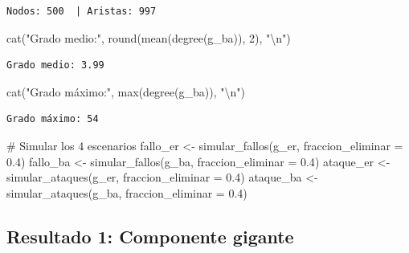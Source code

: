 \documentclass[
  letterpaper,
  DIV=11,
  numbers=noendperiod]{scrreprt}
\newenvironment{Shaded}{\begin{snugshade}}{\end{snugshade}}
\newcommand{\AttributeTok}[1]{\textcolor[rgb]{0.40,0.45,0.13}{#1}}
\newcommand{\CommentTok}[1]{\textcolor[rgb]{0.37,0.37,0.37}{#1}}
\newcommand{\DecValTok}[1]{\textcolor[rgb]{0.68,0.00,0.00}{#1}}
\newcommand{\FloatTok}[1]{\textcolor[rgb]{0.68,0.00,0.00}{#1}}
\newcommand{\FunctionTok}[1]{\textcolor[rgb]{0.28,0.35,0.67}{#1}}
\newcommand{\NormalTok}[1]{\textcolor[rgb]{0.00,0.23,0.31}{#1}}
\newcommand{\OtherTok}[1]{\textcolor[rgb]{0.00,0.23,0.31}{#1}}
\newcommand{\SpecialCharTok}[1]{\textcolor[rgb]{0.37,0.37,0.37}{#1}}
\newcommand{\StringTok}[1]{\textcolor[rgb]{0.13,0.47,0.30}{#1}}
\begin{document}
\begin{verbatim}
Nodos: 500  | Aristas: 997 
\end{verbatim}

\begin{Shaded}
\begin{Highlighting}[]
\FunctionTok{cat}\NormalTok{(}\StringTok{"Grado medio:"}\NormalTok{, }\FunctionTok{round}\NormalTok{(}\FunctionTok{mean}\NormalTok{(}\FunctionTok{degree}\NormalTok{(g\_ba)), }\DecValTok{2}\NormalTok{), }\StringTok{"}\SpecialCharTok{\textbackslash{}n}\StringTok{"}\NormalTok{)}
\end{Highlighting}
\end{Shaded}

\begin{verbatim}
Grado medio: 3.99 
\end{verbatim}

\begin{Shaded}
\begin{Highlighting}[]
\FunctionTok{cat}\NormalTok{(}\StringTok{"Grado máximo:"}\NormalTok{, }\FunctionTok{max}\NormalTok{(}\FunctionTok{degree}\NormalTok{(g\_ba)), }\StringTok{"}\SpecialCharTok{\textbackslash{}n}\StringTok{"}\NormalTok{)}
\end{Highlighting}
\end{Shaded}

\begin{verbatim}
Grado máximo: 54 
\end{verbatim}

\begin{Shaded}
\begin{Highlighting}[]
\CommentTok{\# Simular los 4 escenarios}
\NormalTok{fallo\_er  }\OtherTok{\textless{}{-}} \FunctionTok{simular\_fallos}\NormalTok{(g\_er, }\AttributeTok{fraccion\_eliminar =} \FloatTok{0.4}\NormalTok{)}
\NormalTok{fallo\_ba  }\OtherTok{\textless{}{-}} \FunctionTok{simular\_fallos}\NormalTok{(g\_ba, }\AttributeTok{fraccion\_eliminar =} \FloatTok{0.4}\NormalTok{)}
\NormalTok{ataque\_er }\OtherTok{\textless{}{-}} \FunctionTok{simular\_ataques}\NormalTok{(g\_er, }\AttributeTok{fraccion\_eliminar =} \FloatTok{0.4}\NormalTok{)}
\NormalTok{ataque\_ba }\OtherTok{\textless{}{-}} \FunctionTok{simular\_ataques}\NormalTok{(g\_ba, }\AttributeTok{fraccion\_eliminar =} \FloatTok{0.4}\NormalTok{)}
\end{Highlighting}
\end{Shaded}

\subsection{Resultado 1: Componente
gigante}\label{resultado-1-componente-gigante}
\end{document}
